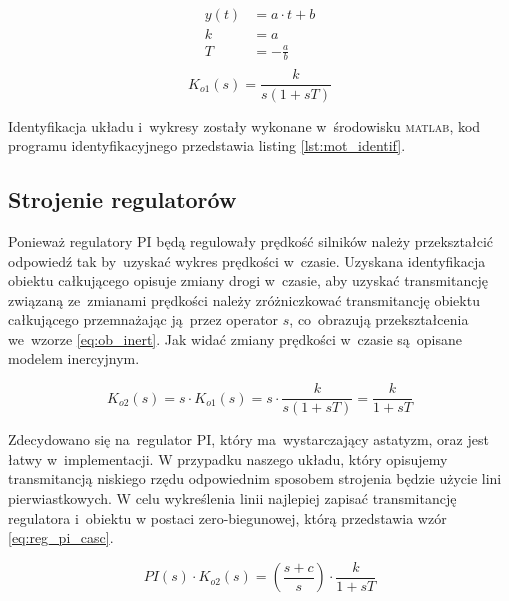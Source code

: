 \documentclass[11pt]{article}
\begin{document}
\begin{equation} \label{eq:line_param}
\begin{aligned}
	y(t) &= a \cdot t + b \\
	k &= a \\
	T &= - \frac{a}{b} \\
\end{aligned}
\end{equation}
\begin{equation} \label{eq:ob_int}
	K_{o1} \left( s \right) = \frac{k}{s \left( 1 + sT \right)}
\end{equation}

Identyfikacja układu i~wykresy zostały wykonane w~środowisku \textsc{matlab}, kod programu identyfikacyjnego przedstawia listing \ref{lst:mot_identif}.

\subsection{Strojenie regulatorów}
Ponieważ regulatory \textsc{PI} będą regulowały prędkość silników należy przekształcić odpowiedź tak by~uzyskać wykres prędkości w~czasie.
Uzyskana identyfikacja obiektu całkującego opisuje zmiany drogi w~czasie, aby uzyskać transmitancję związaną ze~zmianami prędkości należy zróżniczkować transmitancję obiektu całkującego przemnażając ją~przez operator $ s $, co~obrazują przekształcenia we~wzorze \ref{eq:ob_inert}. Jak widać zmiany prędkości w~czasie są~opisane modelem inercyjnym.

\begin{equation} \label{eq:ob_inert}
	K_{o2} \left( s \right) = s \cdot K_{o1} \left( s \right) = s \cdot \frac{k}{s \left( 1 + sT \right)} = \frac{k}{1 + sT}
\end{equation}

Zdecydowano się na~regulator \textsc{PI}, który ma~wystarczający astatyzm, oraz jest łatwy w~implementacji.
W przypadku naszego układu, który opisujemy transmitancją niskiego rzędu odpowiednim sposobem strojenia będzie użycie lini pierwiastkowych.
W celu wykreślenia linii najlepiej zapisać transmitancję regulatora i~obiektu w postaci zero-biegunowej, którą przedstawia wzór \ref{eq:reg_pi_casc}.

\begin{equation} \label{eq:reg_pi_casc}
	PI \left( s \right) \cdot K_{o2} \left( s \right) = \left( \frac{s + c}{s} \right) \cdot \frac{k}{1 + sT}
\end{equation}
\end{document}
